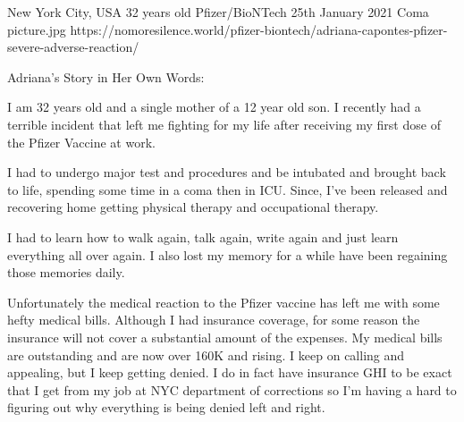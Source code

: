 {New York City, USA}
{32 years old}
{Pfizer/BioNTech}
{25th January 2021}
{Coma}
{picture.jpg}
{https://nomoresilence.world/pfizer-biontech/adriana-capontes-pfizer-severe-adverse-reaction/}
{

Adriana’s Story in Her Own Words:

I am 32 years old and a single mother of a 12 year old son. I recently had a
terrible incident that left me fighting for my life after receiving my first
dose of the Pfizer Vaccine at work.

I had to undergo major test and procedures and be intubated and brought back to
life, spending some time in a coma then in ICU. Since, I’ve been released and
recovering home getting physical therapy and occupational therapy.

I had to learn how to walk again, talk again, write again and just learn
everything all over again. I also lost my memory for a while have been regaining
those memories daily.

Unfortunately the medical reaction to the Pfizer vaccine has left me with some
hefty medical bills. Although I had insurance coverage, for some reason the
insurance will not cover a substantial amount of the expenses. My medical bills
are outstanding and are now over 160K and rising. I keep on calling and
appealing, but I keep getting denied. I do in fact have insurance GHI to be
exact that I get from my job at NYC department of corrections so I’m having a
hard to figuring out why everything is being denied left and right.

}
